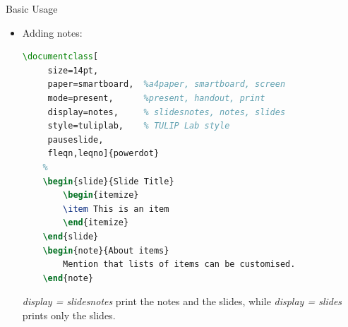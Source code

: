 \documentclass[
 size=14pt,
 paper=smartboard,  %
 mode=present, 		%
 display=slides, 	%
 style=tuliplab,  	%
 pauseslide,
 fleqn,leqno]{powerdot}
\begin{document}
\begin{slide}[toc=,bm=,method=direct]{Basic Usage}
 \begin{itemize}
  \item Adding notes:
  \begin{lstlisting}[language=TeX]
  \documentclass[
     size=14pt,
     paper=smartboard,  %a4paper, smartboard, screen
     mode=present, 		%present, handout, print
     display=notes, 	% slidesnotes, notes, slides
     style=tuliplab,  	% TULIP Lab style
     pauseslide,
     fleqn,leqno]{powerdot}
    %
    \begin{slide}{Slide Title}
        \begin{itemize}
        \item This is an item
        \end{itemize}
    \end{slide}
    \begin{note}{About items}
        Mention that lists of items can be customised.
    \end{note}
  \end{lstlisting}
  \textit{display = slidesnotes} print the notes and the slides,
  while \textit{display = slides} prints only the slides.
\end{itemize}
\end{slide}
\end{document}
